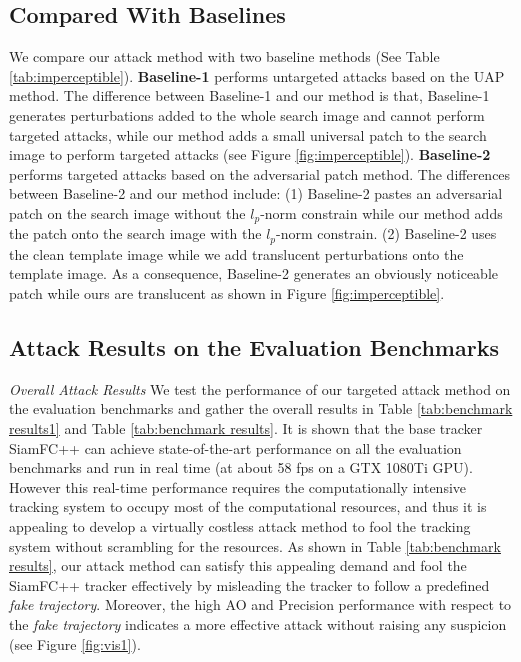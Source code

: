 \documentclass[journal]{IEEEtran}
\begin{document}
\subsection{Compared With Baselines}

We compare our attack method with two baseline methods (See Table \ref{tab:imperceptible}).
\textbf{Baseline-1} performs untargeted attacks based on the UAP \cite{UAP} method. The difference between Baseline-1 and our method is that, Baseline-1 generates perturbations added to the whole search image and cannot perform targeted attacks, while our method adds a small universal patch to the search image to perform targeted attacks (see Figure \ref{fig:imperceptible}).
\textbf{Baseline-2} performs targeted attacks based on the adversarial patch \cite{patch} method. The differences between Baseline-2 and our method include: (1) Baseline-2 pastes an adversarial patch on the search image without the $l_p\text{-norm}$ constrain while our method adds the patch onto the search image with the $l_p\text{-norm}$ constrain. 
(2) Baseline-2 uses the clean template image while we add translucent perturbations onto the template image. As a consequence, Baseline-2 generates an obviously noticeable patch while ours are translucent as shown in Figure \ref{fig:imperceptible}.

\subsection{Attack Results on the Evaluation Benchmarks}

\textit{Overall Attack Results} We test the performance of our targeted attack method on the evaluation benchmarks and gather the overall results in Table \ref{tab:benchmark results1} and Table \ref{tab:benchmark results}. It is shown that the base tracker SiamFC++ can achieve state-of-the-art performance on all the evaluation benchmarks and run in real time (at about 58 fps on a GTX 1080Ti GPU). However this real-time performance requires the computationally intensive tracking system to occupy most of the computational resources, and thus it is appealing to develop a virtually costless attack method to fool the tracking system without scrambling for the resources. As shown in Table \ref{tab:benchmark results}, our attack method can satisfy this appealing demand and fool the SiamFC++ tracker effectively by misleading the tracker to follow a predefined \textit{fake trajectory}. Moreover, the high AO and Precision performance with respect to the \textit{fake trajectory} indicates a more effective attack without raising any suspicion (see Figure \ref{fig:vis1}).
\end{document}
